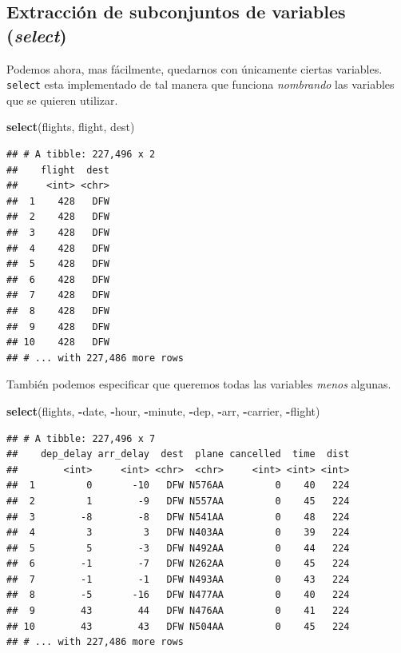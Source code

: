 \documentclass[]{article}
\newenvironment{Shaded}{\begin{snugshade}}{\end{snugshade}}
\newcommand{\KeywordTok}[1]{\textcolor[rgb]{0.13,0.29,0.53}{\textbf{#1}}}
\newcommand{\OperatorTok}[1]{\textcolor[rgb]{0.81,0.36,0.00}{\textbf{#1}}}
\newcommand{\NormalTok}[1]{#1}
\begin{document}
\subsection{\texorpdfstring{Extracción de subconjuntos de variables
(\emph{select})}{Extracción de subconjuntos de variables (select)}}\label{extraccion-de-subconjuntos-de-variables-select}

Podemos ahora, mas fácilmente, quedarnos con únicamente ciertas
variables. \texttt{select} esta implementado de tal manera que funciona
\emph{nombrando} las variables que se quieren utilizar.

\begin{Shaded}
\begin{Highlighting}[]
\KeywordTok{select}\NormalTok{(flights, flight, dest)}
\end{Highlighting}
\end{Shaded}

\begin{verbatim}
## # A tibble: 227,496 x 2
##    flight  dest
##     <int> <chr>
##  1    428   DFW
##  2    428   DFW
##  3    428   DFW
##  4    428   DFW
##  5    428   DFW
##  6    428   DFW
##  7    428   DFW
##  8    428   DFW
##  9    428   DFW
## 10    428   DFW
## # ... with 227,486 more rows
\end{verbatim}

También podemos especificar que queremos todas las variables
\emph{menos} algunas.

\begin{Shaded}
\begin{Highlighting}[]
\KeywordTok{select}\NormalTok{(flights, }\OperatorTok{-}\NormalTok{date, }\OperatorTok{-}\NormalTok{hour, }\OperatorTok{-}\NormalTok{minute, }\OperatorTok{-}\NormalTok{dep, }\OperatorTok{-}\NormalTok{arr, }\OperatorTok{-}\NormalTok{carrier, }\OperatorTok{-}\NormalTok{flight)}
\end{Highlighting}
\end{Shaded}

\begin{verbatim}
## # A tibble: 227,496 x 7
##    dep_delay arr_delay  dest  plane cancelled  time  dist
##        <int>     <int> <chr>  <chr>     <int> <int> <int>
##  1         0       -10   DFW N576AA         0    40   224
##  2         1        -9   DFW N557AA         0    45   224
##  3        -8        -8   DFW N541AA         0    48   224
##  4         3         3   DFW N403AA         0    39   224
##  5         5        -3   DFW N492AA         0    44   224
##  6        -1        -7   DFW N262AA         0    45   224
##  7        -1        -1   DFW N493AA         0    43   224
##  8        -5       -16   DFW N477AA         0    40   224
##  9        43        44   DFW N476AA         0    41   224
## 10        43        43   DFW N504AA         0    45   224
## # ... with 227,486 more rows
\end{verbatim}
\end{document}
